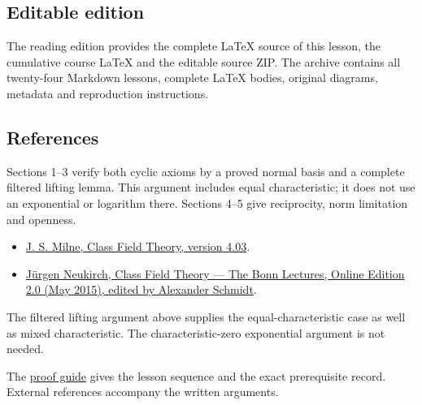 \documentclass[11pt,a4paper]{article}
\newcommand{\tightlist}{\setlength{\itemsep}{0pt}\setlength{\parskip}{0pt}}
\begin{document}
\subsection{Editable edition}\label{editable-edition}

The reading edition provides the complete LaTeX source of this lesson,
the cumulative course LaTeX and the editable source ZIP. The archive
contains all twenty-four Markdown lessons, complete LaTeX bodies,
original diagrams, metadata and reproduction instructions.

\subsection{References}\label{references}

Sections 1--3 verify both cyclic axioms by a proved normal basis and a
complete filtered lifting lemma. This argument includes equal
characteristic; it does not use an exponential or logarithm there.
Sections 4--5 give reciprocity, norm limitation and openness.

\begin{itemize}
\tightlist
\item
  \href{https://www.jmilne.org/math/CourseNotes/CFT.pdf}{J. S. Milne,
  Class Field Theory, version 4.03}.
\item
  \href{https://www.mathi.uni-heidelberg.de/~schmidt/Neukirch-en/Neukirch_cft_02_may15.pdf}{Jürgen
  Neukirch, Class Field Theory --- The Bonn Lectures, Online Edition 2.0
  (May 2015), edited by Alexander Schmidt}.
\end{itemize}

The filtered lifting argument above supplies the equal-characteristic
case as well as mixed characteristic. The characteristic-zero
exponential argument is not needed.

The \href{../free-proofs.html}{proof guide} gives the lesson sequence
and the exact prerequisite record. External references accompany the
written arguments.
\end{document}
